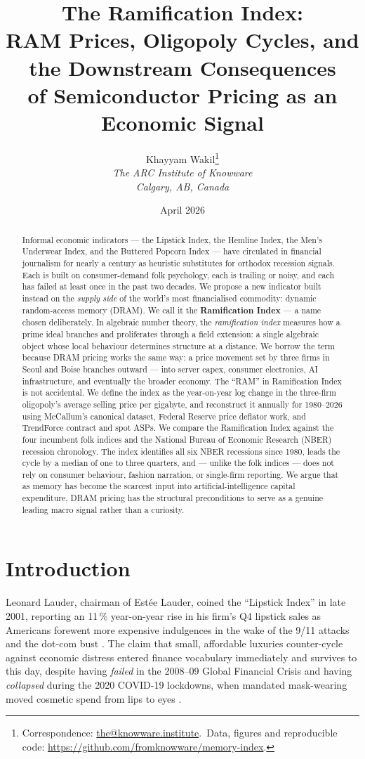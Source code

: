\documentclass[11pt,a4paper]{article}
\title{\textbf{The Ramification Index:\\
RAM Prices, Oligopoly Cycles, and the Downstream Consequences\\
of Semiconductor Pricing as an Economic Signal}}
\author{%
  Khayyam Wakil\thanks{Correspondence: \href{mailto:the@knowware.institute}{the@knowware.institute}.\ Data, figures and reproducible code: \url{https://github.com/fromknowware/memory-index}.}\\
  \textit{The ARC Institute of Knowware}\\
  \textit{Calgary, AB, Canada}
}
\date{April 2026}
\begin{document}
\maketitle

\begin{abstract}
Informal economic indicators --- the Lipstick Index, the Hemline Index, the Men's Underwear Index, and the Buttered Popcorn Index --- have circulated in financial journalism for nearly a century as heuristic substitutes for orthodox recession signals. Each is built on consumer-demand folk psychology, each is trailing or noisy, and each has failed at least once in the past two decades. We propose a new indicator built instead on the \emph{supply side} of the world's most financialised commodity: dynamic random-access memory (DRAM). We call it the \textbf{Ramification Index} --- a name chosen deliberately. In algebraic number theory, the \emph{ramification index} measures how a prime ideal branches and proliferates through a field extension: a single algebraic object whose local behaviour determines structure at a distance. We borrow the term because DRAM pricing works the same way: a price movement set by three firms in Seoul and Boise branches outward --- into server capex, consumer electronics, AI infrastructure, and eventually the broader economy. The ``RAM'' in Ramification Index is not accidental. We define the index as the year-on-year log change in the three-firm oligopoly's average selling price per gigabyte, and reconstruct it annually for 1980--2026 using McCallum's canonical dataset, Federal Reserve price deflator work, and TrendForce contract and spot ASPs. We compare the Ramification Index against the four incumbent folk indices and the National Bureau of Economic Research (NBER) recession chronology. The index identifies all six NBER recessions since 1980, leads the cycle by a median of one to three quarters, and --- unlike the folk indices --- does not rely on consumer behaviour, fashion narration, or single-firm reporting. We argue that as memory has become the scarcest input into artificial-intelligence capital expenditure, DRAM pricing has the structural preconditions to serve as a genuine leading macro signal rather than a curiosity.
\end{abstract}

\section{Introduction}
\label{sec:intro}

Leonard Lauder, chairman of Est\'ee Lauder, coined the ``Lipstick Index'' in late 2001, reporting an 11\,\% year-on-year rise in his firm's Q4 lipstick sales as Americans forewent more expensive indulgences in the wake of the 9/11 attacks and the dot-com bust \citep{nelson2001,schor1999,hill2012}. The claim that small, affordable luxuries counter-cycle against economic distress entered finance vocabulary immediately and survives to this day, despite having \emph{failed} in the 2008--09 Global Financial Crisis and having \emph{collapsed} during the 2020 COVID-19 lockdowns, when mandated mask-wearing moved cosmetic spend from lips to eyes \citep{schaefer2008,tan2008,scott2020,bryan2022}.
\end{document}
